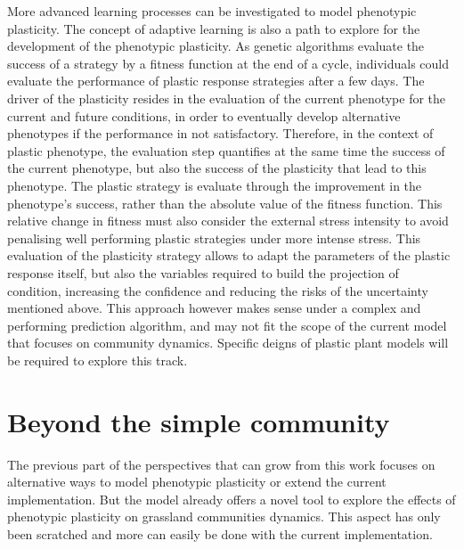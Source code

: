 More advanced learning processes can be investigated to model phenotypic plasticity. The concept of adaptive learning is also a path to explore for the development of the phenotypic plasticity. As genetic algorithms evaluate the success of a strategy by a fitness function at the end of a cycle, individuals could evaluate the performance of plastic response strategies after a few days. The driver of the plasticity resides in the evaluation of the current phenotype for the current and future conditions, in order to eventually develop alternative phenotypes if the performance in not satisfactory. Therefore, in the context of plastic phenotype, the evaluation step quantifies at the same time the success of the current phenotype, but also the success of the plasticity that lead to this phenotype. The plastic strategy is evaluate through the improvement in the phenotype's success, rather than the absolute value of the fitness function. This relative change in fitness must also consider the external stress intensity to avoid penalising well performing plastic strategies under more intense stress. This evaluation of the plasticity strategy allows to adapt the parameters of the plastic response itself, but also the variables required to build the projection of condition, increasing the confidence and reducing the risks of the uncertainty mentioned above. This approach however makes sense under a complex and performing prediction algorithm, and may not fit the scope of the current model that focuses on community dynamics. Specific deigns of plastic plant models will be required to explore this track.





\section{Beyond the simple community}

The previous part of the perspectives that can grow from this work focuses on alternative ways to model phenotypic plasticity or extend the current implementation. But the model already offers a novel tool to explore the effects of phenotypic plasticity on grassland communities dynamics. This aspect has only been scratched and more can easily be done with the current implementation.


